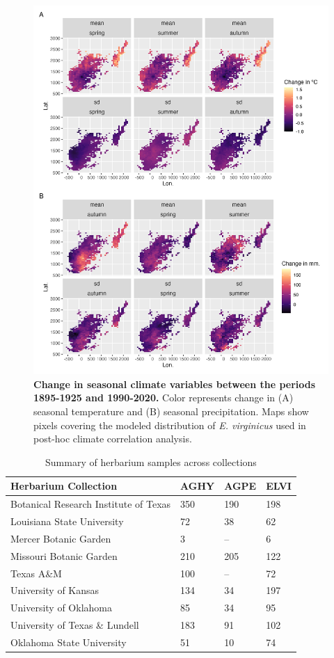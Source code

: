 \documentclass[11pt]{article}
\begin{document}
\begin{figure}[H]
	\centering
	\includegraphics[width = .8\linewidth]{../Plots/ELVI_climate_change_plot.png}
	\caption{\textbf{Change in seasonal climate variables between the periods 1895-1925 and 1990-2020.} Color represents change in (A) seasonal temperature and (B) seasonal precipitation. Maps show pixels covering the modeled distribution of \emph{E. virginicus} used in post-hoc climate correlation analysis.}
	\label{fig:ELVI_climate_covariates}
\end{figure}


	
	\begin{table}[h]
		\caption{Summary of herbarium samples across collections}
		\label{table:herbaria}
		\centering
		\begin{tabular}{llll}\hline
			Herbarium Collection        & AGHY        & AGPE      &      ELVI\\ \hline
			Botanical Research Institute of Texas &   350   &    190&    198    \\
			Louisiana State University &     72  & 38  &   62       \\
			Mercer Botanic Garden &   3    & --     &     6\\
			Missouri Botanic Garden& 210 & 205 & 122\\
		    Texas A\&M &  100 &-- & 72 \\
		    University of Kansas & 134 & 34 &  197\\
		    University of Oklahoma & 85 &34&  95\\
		    University of Texas  \& Lundell   &  183& 91& 102\\		    				 			     			     
			Oklahoma State University&     51  &   10    &  74 \\ \hline
		\end{tabular}
		\bigskip{}

	\end{table}	
\end{document}
